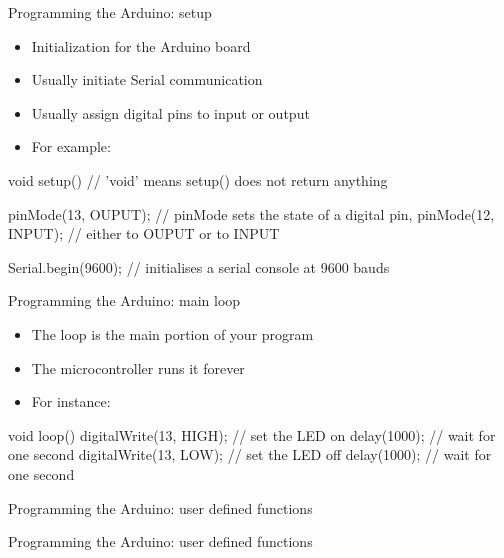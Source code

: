 \documentclass[compress]{beamer}
\makeatletter
\let\beamer@writeslidentry@miniframeson=\beamer@writeslidentry
\def\beamer@writeslidentry@miniframesoff{%
  \expandafter\beamer@ifempty\expandafter{\beamer@framestartpage}{}%
  {%
    \clearpage\beamer@notesactions%
  }
}
\newcommand*{\miniframeson}{\let\beamer@writeslidentry=\beamer@writeslidentry@miniframeson}
\newcommand*{\miniframesoff}{\let\beamer@writeslidentry=\beamer@writeslidentry@miniframesoff}
\makeatother
\begin{document}
\begin{frame}[fragile]{Programming the Arduino: setup}
    \begin{itemize}
        \item Initialization for the Arduino board
        \item Usually initiate Serial communication
        \item Usually assign digital pins to input or output
        \item For example:
    \end{itemize}

            \begin{cppcode}
void setup() // 'void' means setup() does not return anything
{
    pinMode(13, OUPUT); // pinMode sets the state of a digital pin,
    pinMode(12, INPUT); // either to OUPUT or to INPUT

    Serial.begin(9600); // initialises a serial console at 9600 bauds
}

            \end{cppcode}
\end{frame}


\begin{frame}[fragile]{Programming the Arduino: main loop}
    \begin{itemize}
        \item The loop is the main portion of your program
        \item The microcontroller runs it forever
        \item For instance:
    \end{itemize}

            \begin{cppcode}
void loop()
{
    digitalWrite(13, HIGH); // set the LED on
    delay(1000);            // wait for one second
    digitalWrite(13, LOW);  // set the LED off
    delay(1000);            // wait for one second
}

            \end{cppcode}
\end{frame}


{
    \begin{frame}{Programming the Arduino: user defined functions}
    \end{frame}
}

\miniframesoff
{
    \begin{frame}{Programming the Arduino: user defined functions}
    \end{frame}
}
\miniframeson
\end{document}
